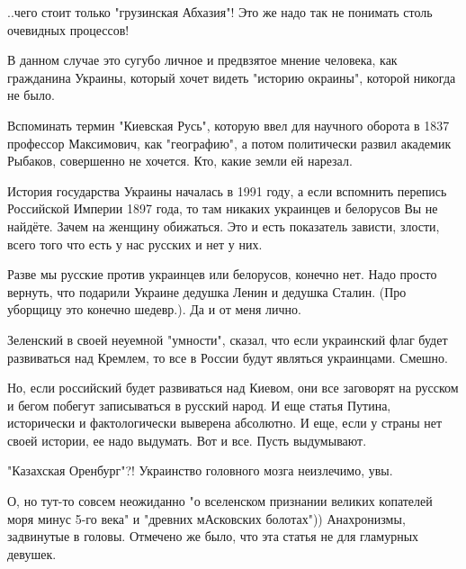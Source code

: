 \begin{itemize}
..чего стоит только "грузинская Абхазия"! Это же надо так не понимать столь очевидных процессов!


 

В данном случае это сугубо личное и предвзятое мнение человека, как гражданина
Украины, который хочет видеть "историю окраины", которой никогда не было.

Вспоминать термин "Киевская Русь", которую ввел для научного оборота в 1837
профессор Максимович, как "географию", а потом политически развил академик
Рыбаков, совершенно не хочется. Кто, какие земли ей нарезал. 

История государства Украины началась в 1991 году, а если вспомнить перепись
Российской Империи 1897 года, то там никаких украинцев и белорусов Вы не
найдёте. Зачем на женщину обижаться. Это и есть показатель зависти, злости,
всего того что есть у нас русских и нет у них. 

Разве мы русские против украинцев или белорусов, конечно нет. Надо просто
вернуть, что подарили Украине дедушка Ленин и дедушка Сталин. (Про уборщицу это
конечно шедевр.). Да и от меня лично. 

Зеленский в своей неуемной "умности", сказал, что если украинский флаг будет
развиваться над Кремлем, то все в России будут являться украинцами. Смешно. 

Но, если российский будет развиваться над Киевом, они все заговорят на русском
и бегом побегут записываться в русский народ. И еще статья Путина, исторически
и фактологически выверена абсолютно. И еще, если у страны нет своей истории, ее
надо выдумать. Вот и все. Пусть выдумывают.

 
"Казахская Оренбург"?! Украинство головного мозга неизлечимо, увы.

 

О, но тут-то совсем неожиданно "о вселенском признании великих копателей моря
минус 5-го века" и "древних мАсковских болотах")) Анахронизмы, задвинутые в
головы. Отмечено же было, что эта статья не для гламурных девушек.


\end{itemize}
